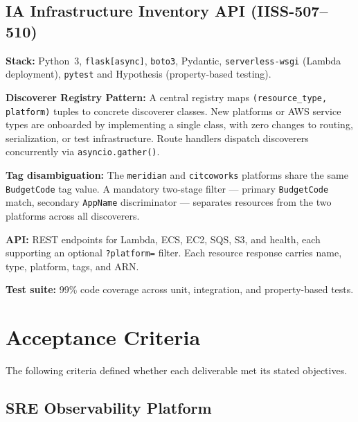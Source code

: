 \subsection{IA Infrastructure Inventory API (IISS-507--510)}

\textbf{Stack:} Python~3, \texttt{flask[async]}, \texttt{boto3},
Pydantic, \texttt{serverless-wsgi} (Lambda deployment), \texttt{pytest}
and Hypothesis (property-based testing).

\textbf{Discoverer Registry Pattern:} A central registry maps
\texttt{(resource\_type, platform)} tuples to concrete discoverer
classes. New platforms or AWS service types are onboarded by implementing
a single class, with zero changes to routing, serialization, or test
infrastructure. Route handlers dispatch discoverers concurrently via
\texttt{asyncio.gather()}.

\textbf{Tag disambiguation:} The \texttt{meridian} and \texttt{citcoworks}
platforms share the same \texttt{BudgetCode} tag value. A mandatory
two-stage filter --- primary \texttt{BudgetCode} match, secondary
\texttt{AppName} discriminator --- separates resources from the two
platforms across all discoverers.

\textbf{API:} REST endpoints for Lambda, ECS, EC2, SQS, S3, and health,
each supporting an optional \texttt{?platform=} filter. Each resource
response carries name, type, platform, tags, and ARN.

\textbf{Test suite:} 99\% code coverage across unit, integration, and
property-based tests.

\section{Acceptance Criteria}
\label{sec:acceptance_criteria}

The following criteria defined whether each deliverable met its stated
objectives.

\subsection{SRE Observability Platform}

